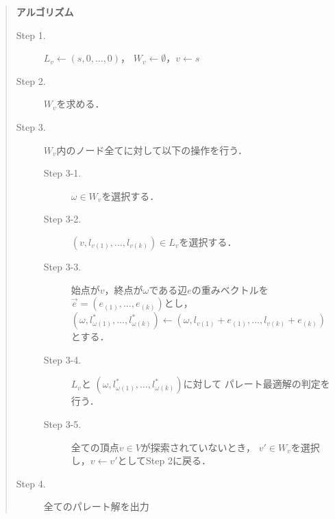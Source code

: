 \documentclass[12pt]{optlab-bachelor}
\begin{document}
\begin{quote}
  \textbf{アルゴリズム}
  \begin{description}
    \item[Step 1.] $L_v \leftarrow (s,0,\ldots,0)$，
    $W_v \leftarrow \emptyset$，$v \leftarrow s$
    \item[Step 2.] $W_v$を求める．
    \item[Step 3.] $W_v$内のノード全てに対して以下の操作を行う．
    \begin{description}
      \item[Step 3-1.] $\omega \in W_v$を選択する．
      \item[Step 3-2.] $(v,l_{v(1)},\ldots,l_{v(k)}) \in L_v$を選択する．
      \item[Step 3-3.] 始点が$v$，終点が$\omega$である辺$e$の重みベクトルを
      $\vec{e} = (e_{(1)},\ldots,e_{(k)})$とし，
      $(\omega,l^*_{\omega(1)},\ldots,l^*_{\omega(k)}) \leftarrow
      (\omega,l_{v(1)}+e_{(1)},\ldots,l_{v(k)}+e_{(k)})$とする．
      \item[Step 3-4.] $L_v$と
      $(\omega,l^*_{\omega(1)},\ldots,l^*_{\omega(k)})$に対して
      パレート最適解の判定を行う．
      \item[Step 3-5.] 全ての頂点$v \in V$が探索されていないとき，
      $v' \in W_v$を選択し，$v\leftarrow v'$としてStep 2に戻る．
    \end{description}
    \item[Step 4.] 全てのパレート解を出力
  \end{description}
\end{quote}
\end{document}
